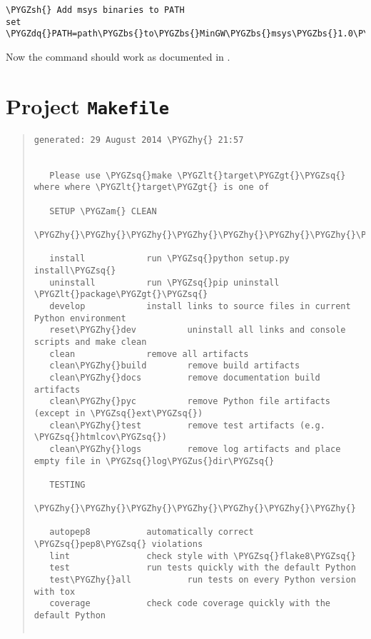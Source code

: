 \documentclass[letterpaper,10pt,english]{sphinxmanual}
\def\PYGZbs{\char`\\}
\def\PYGZus{\char`\_}
\def\PYGZam{\char`\&}
\def\PYGZlt{\char`\<}
\def\PYGZgt{\char`\>}
\def\PYGZsh{\char`\#}
\def\PYGZpc{\char`\%}
\def\PYGZhy{\char`\-}
\def\PYGZsq{\char`\'}
\def\PYGZdq{\char`\"}
\begin{document}
\begin{Verbatim}[commandchars=\\\{\}]
\PYGZsh{} Add msys binaries to PATH
set \PYGZdq{}PATH=path\PYGZbs{}to\PYGZbs{}MinGW\PYGZbs{}msys\PYGZbs{}1.0\PYGZbs{}bin;\PYGZpc{}PATH\PYGZpc{}\PYGZdq{}
\end{Verbatim}

Now the  command should work as documented in .


\section{Project \texttt{Makefile}}
\label{project_makefile:project-makefile}\label{project_makefile::doc}\begin{quote}

\begin{Verbatim}[commandchars=\\\{\}]
generated: 29 August 2014 \PYGZhy{} 21:57


   Please use \PYGZsq{}make \PYGZlt{}target\PYGZgt{}\PYGZsq{} where where \PYGZlt{}target\PYGZgt{} is one of

   SETUP \PYGZam{} CLEAN
   \PYGZhy{}\PYGZhy{}\PYGZhy{}\PYGZhy{}\PYGZhy{}\PYGZhy{}\PYGZhy{}\PYGZhy{}\PYGZhy{}\PYGZhy{}\PYGZhy{}\PYGZhy{}\PYGZhy{}

   install            run \PYGZsq{}python setup.py install\PYGZsq{}
   uninstall          run \PYGZsq{}pip uninstall \PYGZlt{}package\PYGZgt{}\PYGZsq{}
   develop            install links to source files in current Python environment
   reset\PYGZhy{}dev          uninstall all links and console scripts and make clean
   clean              remove all artifacts
   clean\PYGZhy{}build        remove build artifacts
   clean\PYGZhy{}docs         remove documentation build artifacts
   clean\PYGZhy{}pyc          remove Python file artifacts (except in \PYGZsq{}ext\PYGZsq{})
   clean\PYGZhy{}test         remove test artifacts (e.g. \PYGZsq{}htmlcov\PYGZsq{})
   clean\PYGZhy{}logs         remove log artifacts and place empty file in \PYGZsq{}log\PYGZus{}dir\PYGZsq{}

   TESTING
   \PYGZhy{}\PYGZhy{}\PYGZhy{}\PYGZhy{}\PYGZhy{}\PYGZhy{}\PYGZhy{}

   autopep8           automatically correct \PYGZsq{}pep8\PYGZsq{} violations
   lint               check style with \PYGZsq{}flake8\PYGZsq{}
   test               run tests quickly with the default Python
   test\PYGZhy{}all           run tests on every Python version with tox
   coverage           check code coverage quickly with the default Python


\end{Verbatim}
\end{quote}
\end{document}
